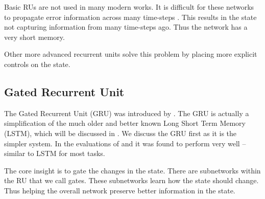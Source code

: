 \documentclass[12pt,parskip]{komatufte}
\begin{document}
Basic RUs are not used in many modern works.
It is difficult for these networks to propagate error information across many time-steps .
This results in the state not capturing information from many time-steps ago.
Thus the network has a very short memory.

Other more advanced recurrent units solve this problem by placing more explicit controls on the state.

\subsection{Gated Recurrent Unit}
The Gated Recurrent Unit (GRU) was introduced by .
The GRU is actually a simplification of the much older and better known Long Short Term Memory (LSTM),
which will be discussed in .
We discuss the GRU first as it is the simpler system.
In the evaluations of  and  it was found to perform very well -- similar to LSTM for most tasks.

The core insight is to gate the changes in the state.
There are subnetworks within the RU that we call gates.
These subnetworks learn how the state should change.
Thus helping the overall network preserve better information in the state.
\end{document}
